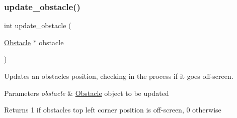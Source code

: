\subsubsection{\texorpdfstring{update\+\_\+obstacle()}{update\_obstacle()}}
{\footnotesize\ttfamily int update\+\_\+obstacle (\begin{DoxyParamCaption}\item[{\hyperlink{struct_obstacle}{Obstacle} $\ast$}]{obstacle }\end{DoxyParamCaption})}



Updates an obstacle\textquotesingle{}s position, checking in the process if it goes off-\/screen. 


\begin{DoxyParams}{Parameters}
{\em obstacle} & \hyperlink{struct_obstacle}{Obstacle} \textquotesingle{}object\textquotesingle{} to be updated \\
\hline
\end{DoxyParams}
\begin{DoxyReturn}{Returns}
1 if obstacle\textquotesingle{}s top left corner position is off-\/screen, 0 otherwise 
\end{DoxyReturn}
